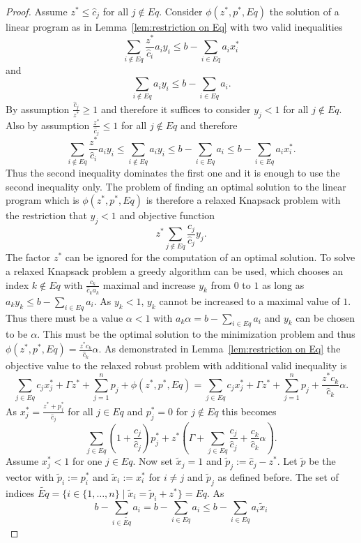 \documentclass[titlepage, a4paper]{amsbook}
\theoremstyle{plain}
\theoremstyle{break}
\theoremstyle{definition}
\theoremstyle{remark}
\numberwithin{equation}{thm}
\begin{document}
\begin{proof}
Assume $z^* \leq \hat{c}_j$ for all $j \notin Eq$. Consider 
$\phi(z^*, p^*, Eq)$ the solution of a linear program as in Lemma~\ref{lem:restriction on Eq} with two valid inequalities
\[\sum_{i \notin Eq} \frac{z^*}{\hat{c}_i}a_iy_i \leq b - \sum_{i \in Eq}a_i x^*_i\]
and 
\[\sum_{i \notin Eq}a_iy_i \leq b - \sum_{i \in Eq}a_i.\]
By assumption $\frac{\hat{c}_j}{z^*} \geq 1$ and therefore it suffices to consider $y_j < 1$ for all $j \notin Eq$. Also by assumption $\frac{z^*}{\hat{c}_j} \leq 1$ for all $j \notin Eq$ and therefore 
\[\sum_{i \notin Eq} \frac{z^*}{\hat{c}_i}a_iy_i \leq \sum_{i \notin Eq} a_iy_i \leq b - \sum_{i \in Eq}a_i \leq b - \sum_{i \in Eq}a_i x^*_i.\]
Thus the second inequality dominates the first one and it is enough to use the second inequality only. The problem of finding an optimal solution to the linear program which is $\phi(z^*,p^*,Eq)$ is therefore a relaxed Knapsack problem with the restriction that $y_j < 1$ and objective function 
\[z^*\sum_{j \notin Eq} \frac{c_j}{\hat{c}_j}y_j.\]
The factor $z^*$ can be ignored for the computation of an optimal solution. To solve a relaxed Knapsack problem a greedy algorithm can be used, which chooses an index $k \notin Eq$ with $\frac{c_k}{\hat{c}_k a_k}$ maximal and increase $y_k$ from $0$ to $1$ as long as $a_k y_k \leq b - \sum_{i \in Eq}a_i$. As $y_k < 1$, $y_k$ cannot be increased to a maximal value of $1$. Thus there must be a value $\alpha < 1$ with $a_k \alpha = b- \sum_{i \in Eq}a_i$ and $y_k$ can be chosen to be $\alpha$. This must be the optimal solution to the minimization problem and thus $\phi(z^*,p^*,Eq)=\frac{z^*c_k}{\hat{c}_k}\alpha$. As demonstrated in Lemma~\ref{lem:restriction on Eq} the objective value to the relaxed robust problem with additional valid inequality 
is 
\[\sum_{j \in Eq}c_jx^*_j + \Gamma z^* + \sum_{j=1}^np_j + \phi(z^*, p^*, Eq)  = \sum_{j \in Eq}c_jx^*_j + \Gamma z^* + \sum_{j=1}^np_j +\frac{z^*c_k}{\hat{c}_k}\alpha.\]
As $x^*_j=\frac{z^* + p^*_j}{\hat{c}_j}$ for all $j \in Eq$ and $p^*_j=0$ for $j \notin Eq$ this becomes
\[\sum_{j \in Eq} (1+\frac{c_j}{\hat{c}_j})p^*_j + z^*(\Gamma + \sum_{j \in Eq}\frac{c_j}{\hat{c}_j} + \frac{c_k}{\hat{c}_k}\alpha).\]
Assume $x^*_j < 1$ for one $j \in Eq$. Now set $\tilde{x}_j=1$ and $\tilde{p}_j := \hat{c}_j-z^*$. Let $\tilde{p}$ be the vector with $\tilde{p}_i:=p^*_i$ and $\tilde{x}_i:=x^*_i$ for $i \neq j$ and $\tilde{p}_j$ as defined before. The set of indices $\widetilde{Eq}=\{i \in \{1, \ldots, n\} \mid \tilde{x}_i=\tilde{p}_i + z^*\}=Eq$. As  \[b - \sum_{i \in \widetilde{Eq}}a_i = b - \sum_{i \in Eq}a_i \leq b - \sum_{i \in Eq}a_i\tilde{x}_i\]

\end{proof}
\end{document}
